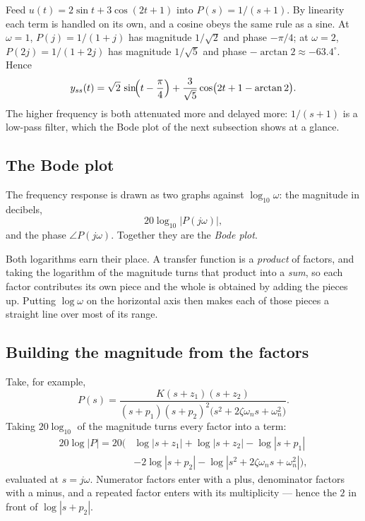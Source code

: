 \documentclass[11pt]{article}
\begin{document}
\begin{example}
Feed $u(t)=2\sin t+3\cos(2t+1)$ into $P(s)=1/(s+1)$. By linearity each term is
handled on its own, and a cosine obeys the same rule as a sine. At $\omega=1$,
$P(j)=1/(1+j)$ has magnitude $1/\sqrt2$ and phase $-\pi/4$; at $\omega=2$,
$P(2j)=1/(1+2j)$ has magnitude $1/\sqrt5$ and phase $-\arctan2\approx-63.4^\circ$.
Hence
\[
   y_{ss}(t) = \sqrt2\,\sin\!\Bigl(t-\frac\pi4\Bigr)
             + \frac{3}{\sqrt5}\cos\bigl(2t+1-\arctan 2\bigr).
\]
The higher frequency is both attenuated more and delayed more: $1/(s+1)$ is a
low-pass filter, which the Bode plot of the next subsection shows at a glance.
\end{example}

\subsection{The Bode plot}
The frequency response is drawn as two graphs against $\log_{10}\omega$: the
magnitude in decibels,
\[
   20\log_{10}|P(j\omega)| ,
\]
and the phase $\angle P(j\omega)$. Together they are the \emph{Bode plot}.

Both logarithms earn their place. A transfer function is a \emph{product} of
factors, and taking the logarithm of the magnitude turns that product into a
\emph{sum}, so each factor contributes its own piece and the whole is obtained by
adding the pieces up. Putting $\log\omega$ on the horizontal axis then makes each
of those pieces a straight line over most of its range.

\subsection{Building the magnitude from the factors}
Take, for example,
\begin{equation}\label{eq:bodeex}
   P(s) = \frac{K(s+z_1)(s+z_2)}
               {(s+p_1)(s+p_2)^{2}\bigl(s^{2}+2\zeta\omega_n s+\omega_n^{2}\bigr)} .
\end{equation}
Taking $20\log_{10}$ of the magnitude turns every factor into a term:
\begin{equation}\label{eq:bodesum}
\begin{aligned}
   20\log|P| = 20\bigl(&\log|s+z_1| + \log|s+z_2| - \log|s+p_1| \\
                       &- 2\log|s+p_2| - \log|s^{2}+2\zeta\omega_n s+\omega_n^{2}|\bigr),
\end{aligned}
\end{equation}
evaluated at $s=j\omega$. Numerator factors enter with a plus, denominator factors
with a minus, and a repeated factor enters with its multiplicity --- hence the
$2$ in front of $\log|s+p_2|$.
\end{document}
